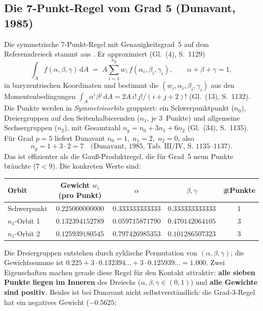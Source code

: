 \documentclass[a4paper,11pt]{article}
\begin{document}
\subsection{Die 7-Punkt-Regel vom Grad 5 (Dunavant, 1985)}
Die symmetrische 7-Punkt-Regel mit Genauigkeitsgrad~5 auf dem Referenzdreieck stammt aus
\citet{dunavant1985}. Er approximiert (Gl.~(4), S.~1129)
\begin{equation}
\int_A f(\alpha,\beta,\gamma)\,\mathrm dA \;=\; A\sum_{i=1}^{n_g} w_i\, f(\alpha_i,\beta_i,\gamma_i),
\qquad \alpha+\beta+\gamma=1,
\end{equation}
in baryzentrischen Koordinaten und bestimmt die $(w_i,\alpha_i,\beta_i,\gamma_i)$ aus den
Momentenbedingungen $\int_A \alpha^i\beta^j\,\mathrm dA = 2A\,i!\,j!/(i+j+2)!$ (Gl.~(13), S.~1132).
Die Punkte werden in \emph{Symmetrieorbits} gruppiert: ein Schwerpunktpunkt ($n_0$), Dreiergruppen
auf den Seitenhalbierenden ($n_1$, je 3~Punkte) und allgemeine Sechsergruppen ($n_2$), mit
Gesamtzahl $n_g = n_0 + 3n_1 + 6n_2$ (Gl.~(34), S.~1135). Für Grad $p=5$ liefert Dunavant
$n_0=1,\;n_1=2,\;n_2=0$, also
\begin{equation}
n_g = 1 + 3\cdot 2 = 7 \quad\text{(Dunavant, 1985, Tab.~III/IV, S.~1135--1137)}.
\end{equation}
Das ist effizienter als die Gauß-Produktregel, die für Grad~5 neun Punkte bräuchte
($7<9$). Die konkreten Werte \citep[Anh.~II, S.~1140]{dunavant1985} sind:
\begin{center}
\small
\begin{tabular}{lcccc}
\toprule
Orbit & Gewicht $w_i$ (pro Punkt) & $\alpha$ & $\beta,\gamma$ & \#Punkte \\
\midrule
Schwerpunkt & $0.225000000000$ & $0.333333333333$ & $0.333333333333$ & 1 \\
$n_1$-Orbit 1 & $0.132394152789$ & $0.059715871790$ & $0.470142064105$ & 3 \\
$n_1$-Orbit 2 & $0.125939180545$ & $0.797426985353$ & $0.101286507323$ & 3 \\
\bottomrule
\end{tabular}
\end{center}
Die Dreiergruppen entstehen durch zyklische Permutation von $(\alpha,\beta,\gamma)$; die
Gewichtssumme ist $0.225 + 3\cdot0.132394\ldots + 3\cdot0.125939\ldots = 1.000$. Zwei Eigenschaften
machen gerade diese Regel für den Kontakt attraktiv: \textbf{alle sieben Punkte liegen im Inneren}
des Dreiecks ($\alpha,\beta,\gamma\in(0,1)$) und \textbf{alle Gewichte sind positiv}. Beides ist
bei Dunavant nicht selbstverständlich: die Grad-3-Regel hat ein negatives Gewicht ($-0.5625$;
\end{document}
